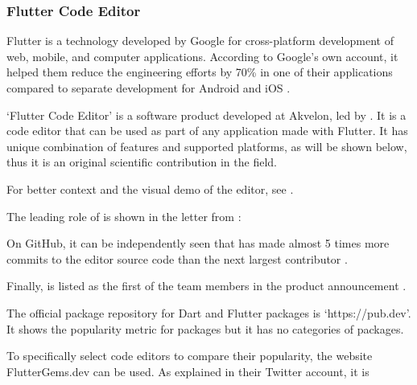 \subsubsection{Flutter Code Editor}
\label{subsubsec:ContributionsFlutter}


Flutter is a technology developed by Google for cross-platform development of web, mobile, and computer applications.
According to Google's own account, it helped them reduce the engineering efforts by 70\%
in one of their applications compared to separate development for Android and iOS .

`Flutter Code Editor' is a software product developed at Akvelon, led by \mrl.
It is a code editor that can be used as part of any application made with Flutter.
It has unique combination of features and supported platforms, as will be shown below,
thus it is an original scientific contribution in the field.

For better context and the visual demo of the editor, see .


The leading role of \mrl is shown in the letter from \MrAkvelonT:


On GitHub, it can be independently seen that \mrl has made almost 5 times more commits
to the editor source code than the next largest contributor .

Finally, \mrl is listed as the first of the team members in the product announcement
.



The official package repository for Dart and Flutter packages is `https://pub.dev'.
It shows the popularity metric for packages but it has no categories of packages.

To specifically select code editors to compare their popularity,
the website FlutterGems.dev can be used.
As explained in their Twitter account, it is



